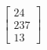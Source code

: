 \documentclass[preview]{standalone}
\begin{document}
\begin{align*}
\begin{bmatrix}24\\237\\13\end{bmatrix}
\end{align*}
\end{document}
